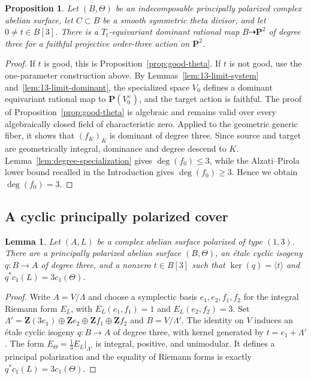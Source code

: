 \documentclass[12pt]{amsart}
\numberwithin{equation}{section}
\newtheorem{proposition}[theorem]{Proposition}
\newtheorem{lemma}[theorem]{Lemma}
\theoremstyle{definition}
\theoremstyle{remark}
\newcommand{\Z}{\mathbf Z}
\newcommand{\PP}{\mathbf P}
\begin{document}
\begin{proposition}\label{prop:all-t}
Let $(B,\Theta)$ be an indecomposable principally polarized complex
abelian surface, let $C\subset B$ be a smooth symmetric theta divisor,
and let $0\ne t\in B[3]$.  There is a $T_t$-equivariant dominant rational
map $B\dashrightarrow\PP^2$ of degree three for a faithful projective
order-three action on $\PP^2$.
\end{proposition}

\begin{proof}
If $t$ is good, this is Proposition~\ref{prop:good-theta}.  If $t$ is
not good, use the one-parameter construction above.  By
Lemmas~\ref{lem:13-limit-system} and~\ref{lem:13-limit-dominant}, the
specialized space $V_0$ defines a dominant equivariant rational map to
$\PP(V_0^\vee)$, and the target action is faithful.  The proof of
Proposition~\ref{prop:good-theta} is algebraic and remains valid over
every algebraically closed field of characteristic zero.  Applied to the
geometric generic fiber, it shows that $(f_K)_{\bar K}$ is dominant of
degree three.  Since source and target are geometrically integral,
dominance and degree descend to $K$.  Lemma~\ref{lem:degree-specialization} gives
$\deg(f_0)\leq3$, while the Alzati--Pirola lower bound recalled in the
Introduction gives $\deg(f_0)\geq3$.  Hence we obtain
$\deg(f_0)=3$.
\end{proof}

\subsection{A cyclic principally polarized cover}

\begin{lemma}\label{lem:13-cover}
Let $(A,L)$ be a complex abelian surface polarized of type $(1,3)$.
There are a principally polarized abelian surface $(B,\Theta)$, an \'etale
cyclic isogeny $q:B\to A$ of degree three, and a nonzero $t\in B[3]$
such that $\ker(q)=\langle t\rangle$ and
$q^*c_1(L)=3c_1(\Theta)$.
\end{lemma}

\begin{proof}
Write $A=V/\Lambda$ and choose a symplectic basis
$e_1,e_2,f_1,f_2$ for the integral Riemann form $E_L$, with
$E_L(e_1,f_1)=1$ and $E_L(e_2,f_2)=3$.  Set
$\Lambda'=\Z(3e_1)\oplus\Z e_2\oplus
\Z f_1\oplus\Z f_2$ and $B=V/\Lambda'$.  The identity on
$V$ induces an \'etale cyclic isogeny $q:B\to A$ of degree three, with
kernel generated by $t=e_1+\Lambda'$.  The form
$E_\Theta=\frac13E_L|_{\Lambda'}$ is integral, positive, and unimodular.
It defines a principal polarization and the equality of Riemann forms is
exactly $q^*c_1(L)=3c_1(\Theta)$.
\end{proof}
\end{document}
